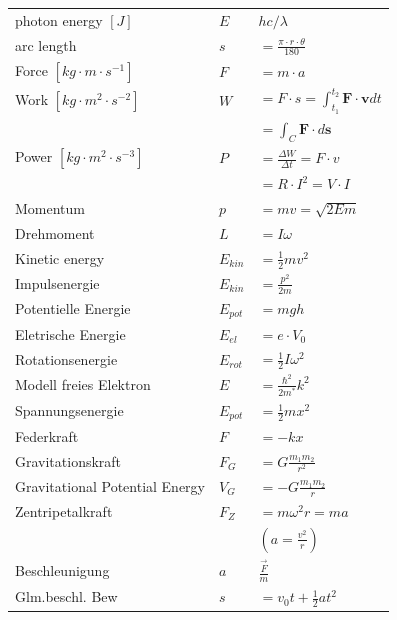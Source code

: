 \documentclass[9pt]{article}
\begin{document}
\begin{multicols}{2}
	\begin{tabular}{lll}
		photon energy $[J]$									&$E$      &$hc/\lambda$\\
		arc length          										&$s$    &$=\frac{\pi \cdot r\cdot \theta}{180}$\\
		Force $[kg\cdot m \cdot s^{-1}]$                 & $F$       & $=m \cdot a$ \\
		Work $[kg\cdot m^2\cdot s^{-2}]$                & $W$       & $=F\cdot s = \int _{t_{1}}^{t_{2}}\mathbf {F} \cdot \mathbf {v} dt$ \\ 
						&		   &$=\int _{C}\mathbf {F} \cdot d\mathbf {s}$                                        \\
		Power $[kg \cdot m^2 \cdot s^{-3}]$               & $P$       & $=\frac{\Delta W}{\Delta t}= F\cdot v$                                       \\
				       &           & $=R\cdot I^2=V\cdot I$                            \\
		Momentum           & $p$               & $=mv=\sqrt{2 E m}$ \\
		Drehmoment	       & $L$       & $=I \omega$						\\
		Kinetic energy     & $E_{kin}$ & $=\frac{1}{2}mv^2$                                \\
		Impulsenergie         & $E_{kin}$ & $=\frac{p^2}{2m}$                                 \\
		Potentielle Energie    & $E_{pot}$ & $=mgh$                                            \\
		Eletrische Energie     & $E_{el}$  & $=e\cdot V_0$                                     \\
		Rotationsenergie      & $E_{rot}$ & $=\frac{1}{2} I \omega^2$			       \\
		Modell freies Elektron & $E$       & $=\frac{\hbar^2}{2m^*}k^2$                        \\
		Spannungsenergie       & $E_{pot}$ & $=\frac{1}{2}mx^2$                                \\
		Federkraft             & $F$       & $=-kx$                                            \\
		Gravitationskraft      & $F_G$     & $=G\frac{m_1m_2}{r^2}$    
		\\
		Gravitational Potential Energy & $V_G$  & $=-G\frac{m_1m_2}{r}$ 
		\\
		Zentripetalkraft       & $F_Z$     & $=m\omega^2r=ma$                                  \\
				       &           & $(a=\frac{v^2}{r})$                               \\
		Beschleunigung         &  $a$      & $\frac{\overrightarrow{F}}{m}$ \\
		Glm.beschl. Bew        & $s$       & $=v_0t+\frac{1}{2}at^2$
	\end{tabular}

\end{multicols}
\end{document}
